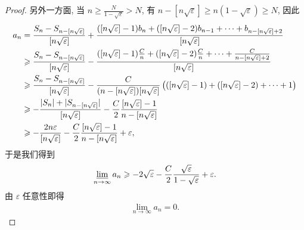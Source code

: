 \documentclass[../../main.tex]{subfiles}%
\begin{document}
\begin{proof}
另外一方面, 当 $n \geqslant \frac{N}{1 - \sqrt{\varepsilon}} > N$, 有 $n - [n\sqrt{\varepsilon}] \geqslant n(1 - \sqrt{\varepsilon}) \geqslant N$, 因此
\begin{align}
a_n &= \frac{S_n - S_{n - [n\sqrt{\varepsilon}]}}{[n\sqrt{\varepsilon}]} + \frac{([n\sqrt{\varepsilon}] - 1) b_n + ([n\sqrt{\varepsilon}] - 2) b_{n-1} + \cdots + b_{n - [n\sqrt{\varepsilon}] + 2}}{[n\sqrt{\varepsilon}]} \notag \\
&\geqslant \frac{S_n - S_{n - [n\sqrt{\varepsilon}]}}{[n\sqrt{\varepsilon}]} - \frac{([n\sqrt{\varepsilon}] - 1) \frac{C}{n} + ([n\sqrt{\varepsilon}] - 2) \frac{C}{n} + \cdots + \frac{C}{n - [n\sqrt{\varepsilon}] + 2}}{[n\sqrt{\varepsilon}]} \notag \\
&\geqslant \frac{S_n - S_{n - [n\sqrt{\varepsilon}]}}{[n\sqrt{\varepsilon}]} - \frac{C}{(n - [n\sqrt{\varepsilon}]) [n\sqrt{\varepsilon}]} \left( ([n\sqrt{\varepsilon}] - 1) + ([n\sqrt{\varepsilon}] - 2) + \cdots + 1 \right) \notag \\
&\geqslant -\frac{|S_n| + |S_{n - [n\sqrt{\varepsilon}]}|}{[n\sqrt{\varepsilon}]} - \frac{C}{2} \frac{[n\sqrt{\varepsilon}] - 1}{n - [n\sqrt{\varepsilon}]} \notag \\
&\geqslant -\frac{2n \varepsilon}{[n\sqrt{\varepsilon}]} - \frac{C}{2} \frac{[n\sqrt{\varepsilon}] - 1}{n - [n\sqrt{\varepsilon}]} + \varepsilon, \label{eq:9.131}
\end{align}
于是我们得到
\begin{align*}
\varliminf_{n \to \infty} a_n \geqslant -2\sqrt{\varepsilon} - \frac{C}{2} \frac{\sqrt{\varepsilon}}{1 - \sqrt{\varepsilon}} + \varepsilon.
\end{align*}
由 $\varepsilon$ 任意性即得
\begin{align*}
\lim_{n \to \infty} a_n = 0.
\end{align*}
\end{proof}
\end{document}
